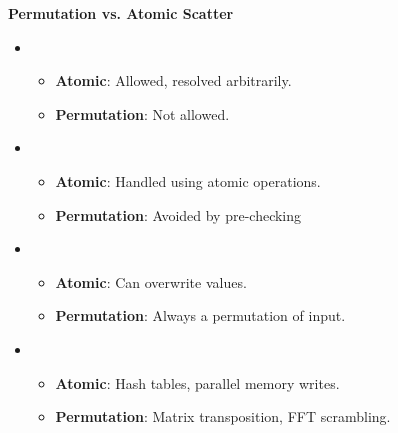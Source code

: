 \highspace
\begin{flushleft}
    \textcolor{Green3}{ \textbf{Permutation vs. Atomic Scatter}}
\end{flushleft}
\begin{itemize}
    \item {}
    \begin{itemize}
        \item \textbf{Atomic}: Allowed, resolved arbitrarily.
        \item \textbf{Permutation}: Not allowed.
    \end{itemize}
    \item {}
    \begin{itemize}
        \item \textbf{Atomic}: Handled using atomic operations.
        \item \textbf{Permutation}: Avoided by pre-checking
    \end{itemize}
    \item {}
    \begin{itemize}
        \item \textbf{Atomic}: Can overwrite values.
        \item \textbf{Permutation}: Always a permutation of input.
    \end{itemize}
    \item {}
    \begin{itemize}
        \item \textbf{Atomic}: Hash tables, parallel memory writes.
        \item \textbf{Permutation}: Matrix transposition, FFT scrambling.
    \end{itemize}
\end{itemize}
